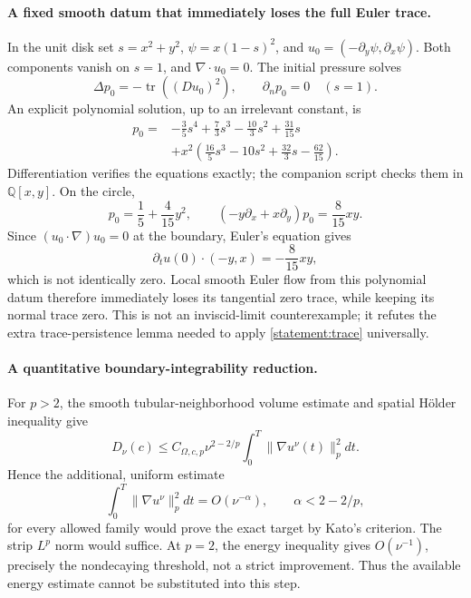 \documentclass[11pt,a4paper]{article}
\newcommand{\Q}{\mathbb{Q}}
\numberwithin{equation}{section}
\begin{document}
\paragraph{A fixed smooth datum that immediately loses the full Euler trace.}
In the unit disk set $s=x^2+y^2$, $\psi=x(1-s)^2$, and
$u_0=(-\partial_y\psi,\partial_x\psi)$. Both components vanish on $s=1$,
and $\nabla\cdot u_0=0$. The initial pressure solves
\[
 \Delta p_0=-\operatorname{tr}((Du_0)^2),\qquad \partial_n p_0=0
 \quad(s=1).
\]
An explicit polynomial solution, up to an irrelevant constant, is
\begin{align*}
 p_0={}&-\frac35s^4+\frac73s^3-\frac{10}3s^2+\frac{31}{15}s\\
 &+x^2\left(\frac{16}5s^3-10s^2+\frac{32}3s-\frac{62}{15}\right).
\end{align*}
Differentiation verifies the equations exactly; the companion script checks
them in $\Q[x,y]$. On the circle,
\[
 p_0=\frac15+\frac4{15}y^2,\qquad
 (-y\partial_x+x\partial_y)p_0=\frac8{15}xy.
\]
Since $(u_0\cdot\nabla)u_0=0$ at the boundary, Euler's equation gives
\[
 \partial_tu(0)\cdot(-y,x)=-\frac8{15}xy,
\]
which is not identically zero. Local smooth Euler flow from this polynomial
datum therefore immediately loses its tangential zero trace, while keeping
its normal trace zero. This is not an inviscid-limit counterexample; it
refutes the extra trace-persistence lemma needed to apply
\eqref{statement:trace} universally.

\paragraph{A quantitative boundary-integrability reduction.}
For $p>2$, the smooth tubular-neighborhood volume estimate and spatial
H\"older inequality give
\[
 D_\nu(c)\le C_{\Omega,c,p}\nu^{2-2/p}
                    \int_0^T\|\nabla u^\nu(t)\|_p^2dt.
\]
Hence the additional, uniform estimate
\begin{equation}\label{statement:missing}
 \int_0^T\|\nabla u^\nu\|_p^2dt=O(\nu^{-\alpha}),
 \qquad \alpha<2-2/p,
\end{equation}
for every allowed family would prove the exact target by Kato's criterion.
The strip $L^p$ norm would suffice. At $p=2$, the energy inequality gives
$O(\nu^{-1})$, precisely the nondecaying threshold, not a strict improvement.
Thus the available energy estimate cannot be substituted into this step.
\end{document}
